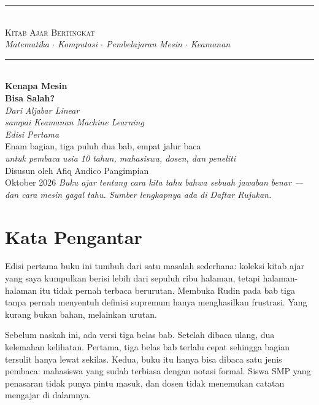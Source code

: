 \documentclass[11pt,a4paper,oneside]{book}
\theoremstyle{definition}
\theoremstyle{plain}
\theoremstyle{remark}
\begin{document}
\frontmatter

\hypersetup{pageanchor=false}
\begin{titlepage}
\centering
\vspace*{1.6cm}
{\color{accent}\rule{\textwidth}{1.2pt}}\\[0.45cm]
{\large\scshape Kitab Ajar Bertingkat}\\[0.15cm]
{\itshape Matematika $\cdot$ Komputasi $\cdot$ Pembelajaran Mesin $\cdot$ Keamanan}\\[0.45cm]
{\color{accent}\rule{\textwidth}{0.6pt}}\\[1.8cm]
{\Huge\bfseries Kenapa Mesin\\[0.25cm] Bisa Salah?}\\[0.7cm]
{\Large\itshape Dari Aljabar Linear\\[0.18cm] sampai Keamanan Machine Learning}\\[0.7cm]
{\large\itshape Edisi Pertama}\\[0.5cm]
{\large Enam bagian, tiga puluh dua bab, empat jalur baca}\\[0.35cm]
{\normalsize\itshape untuk pembaca usia 10 tahun, mahasiswa, dosen, dan peneliti}\\[2.0cm]
{\large Disusun oleh Afiq Andico Pangimpian}\\[0.3cm]
{\large Oktober 2026}
\vfill
{\footnotesize\itshape Buku ajar tentang cara kita tahu bahwa sebuah jawaban benar --- dan
cara mesin gagal tahu. Sumber lengkapnya ada di Daftar Rujukan.}
\end{titlepage}
\hypersetup{pageanchor=true}

\chapter*{Kata Pengantar}

Edisi pertama buku ini tumbuh dari satu masalah sederhana: koleksi kitab ajar yang
saya kumpulkan berisi lebih dari sepuluh ribu halaman, tetapi halaman-halaman itu
tidak pernah terbaca berurutan. Membuka Rudin pada bab tiga tanpa pernah menyentuh
definisi supremum hanya menghasilkan frustrasi. Yang kurang bukan bahan, melainkan
urutan.

Sebelum naskah ini, ada versi tiga belas bab. Setelah dibaca ulang, dua kelemahan
kelihatan. Pertama, tiga belas bab terlalu cepat sehingga bagian tersulit hanya lewat
sekilas. Kedua, buku itu hanya bisa dibaca satu jenis pembaca: mahasiswa yang sudah
terbiasa dengan notasi formal. Siswa SMP yang penasaran tidak punya pintu masuk, dan
dosen tidak menemukan catatan mengajar di dalamnya.
\end{document}

